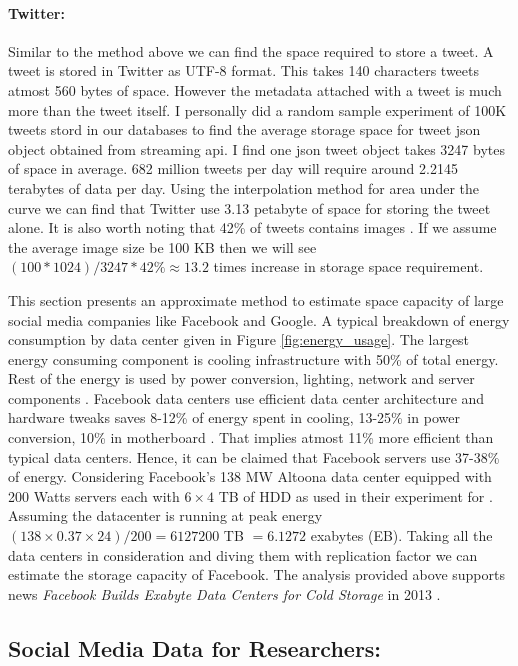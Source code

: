 \paragraph{Twitter:}
Similar to the method above we can find the space required to store a tweet. A tweet is stored in Twitter as UTF-8 format. This takes 140 characters tweets atmost 560 bytes of space. However the metadata attached with a tweet is much more than the tweet itself. I personally did a random sample experiment of 100K tweets stord in our databases to find the average storage space for tweet json object obtained from streaming api. I find one json tweet object takes 3247 bytes of space in average.
682 million tweets per day will require around 2.2145 terabytes of data per day. Using the interpolation method for area under the curve we can find that Twitter use 3.13 petabyte of space for storing the tweet alone. It is also worth noting that 42\% of tweets contains images \cite{tweets_images}. If we assume the average image size be 100 KB then we will see $(100 * 1024)/3247 * 42 \% \approx 13.2$ times increase in storage space requirement.


This section presents an approximate method to estimate space capacity of large social media companies like Facebook and Google.
A typical breakdown of energy consumption by data center given in Figure \ref{fig:energy_usage}.
The largest energy consuming component is cooling infrastructure with 50\% of total energy. Rest of the energy is used by power conversion, lighting, network and server components \cite{info2007top, dayarathna2016data}. Facebook data centers use efficient data center architecture and hardware tweaks  saves
8-12\% of energy spent in cooling, 13-25\% in power conversion, 10\% in motherboard \cite{frachtenberg2011high}. That implies atmost 11\%  more efficient than typical data centers. Hence, it can be claimed that Facebook servers use 37-38\% of energy. Considering Facebook's 138 MW Altoona data center equipped with 200 Watts servers each with $6\times4$ TB of HDD as used in their experiment for \cite{frachtenberg2011high}. Assuming the datacenter is running at peak energy $(138 \times 0.37 \times 24)/ 200 = 6127200$  TB $= 6.1272$ exabytes (EB).
Taking all the data centers in consideration and diving them with replication factor we can estimate the storage capacity of Facebook. The analysis provided above supports news {\em Facebook Builds Exabyte Data Centers for Cold Storage} in 2013 \cite{facebook_support}.


\subsection*{Social Media Data for Researchers:}



